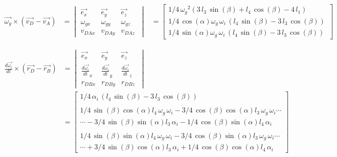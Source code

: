 \begin{equation*}
\begin{split}
\overrightarrow{\omega_{g}}\times(\overrightarrow{v_{D}}-\overrightarrow{v_{A}})
&=	\begin{vmatrix}
	\overrightarrow{e_{x}} & \overrightarrow{e_{y}} & \overrightarrow{e_{z}}\\
	\omega_{gx} & \omega_{gy} & \omega_{gz}\\
	v_{DAx} & v_{DAy} & v_{DAz}\
	\end{vmatrix}
&=	\begin{bmatrix}
	1/4\,{\omega_{g}}^{2} \left( 3\,l_{3}\,\sin\left( \beta \right) +l_{4}\,\cos \left( \beta \right) -4\,l_{1}\right) \\
	1/4\,\cos \left( \alpha \right) \omega_{g}\,\omega_{i}\, \left( l_{4}\,\sin \left( \beta \right) -3\,l_{3}\,\cos \left( \beta \right)  \right) \\
	1/4\,\sin\left( \alpha \right) \omega_{g}\,\omega_{i}\, \left( l_{4}\,\sin\left( \beta \right) -3\,l_{3}\,\cos \left( \beta \right)  \right) \
	\end{bmatrix}
\end{split}
\end{equation*}

\begin{equation*}
\begin{split}
\frac{d\overrightarrow{\omega_i}}{dt}\times(\overrightarrow{r_{D}}-\overrightarrow{r_{B}})
&=	\begin{vmatrix}
	\overrightarrow{e_{x}} & \overrightarrow{e_{y}} & \overrightarrow{e_{z}}\\
	\frac{d\overrightarrow{\omega_i}}{dt}_{x} & \frac{d\overrightarrow{\omega_i}}{dt}_{y} & \frac{d\overrightarrow{\omega_i}}{dt}_{z}\\
	r_{DBx} & r_{DBy} & r_{DBz}\
	\end{vmatrix}\\
&=	\begin{bmatrix}
	1/4\,\alpha_{i}\, \left( l_{4}\,\sin \left( \beta \right) -3\,l_{3}\,\cos \left( \beta \right)  \right) \\
	\\
	1/4\,\sin \left( \beta \right) \cos \left( \alpha\right) l_{4}\,\omega_{g}\,\omega_{i}-3/4\,\cos \left( \beta \right) \cos \left( \alpha \right) l_{3}\,\omega_{g}\,\omega_{i}\cdots\\
	\cdots-3/4\,\sin\left( \beta \right) \sin \left( \alpha \right) l_{3}\,\alpha_{i}-1/4\,\cos \left( \beta \right) \sin \left( \alpha \right) l_{4}\,\alpha_{i}\\
	\\
	1/4\,\sin \left( \beta \right) \sin \left( \alpha \right) l_{4}\,\omega_{g}\,\omega_{i}-3/4\,\cos \left( \beta\right) \sin \left( \alpha \right) l_{3}\,\omega_{g}\,\omega_{i}\cdots\\
	\cdots+3/4\,\sin \left( \beta \right) \cos \left( \alpha \right) l_{3}\,\alpha_{i}+1/4\,\cos \left( \beta \right) \cos \left( \alpha \right) l_{4}\,\alpha_{i}\
	\end{bmatrix}
\end{split}
\end{equation*}

